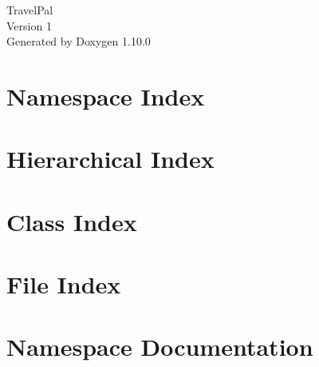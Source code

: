 \documentclass[twoside]{book}
\newcommand{\+}{\discretionary{\mbox{\scriptsize$\hookleftarrow$}}{}{}}
\newcommand{\clearemptydoublepage}{%
    \newpage{\pagestyle{empty}\cleardoublepage}%
  }
\begin{document}
  \raggedbottom
    \hypersetup{pageanchor=false,
                bookmarksnumbered=true,
                pdfencoding=unicode
               }
  \begin{titlepage}
  \vspace*{7cm}
  \begin{center}%
  {\Large Travel\+Pal}\\
  [1ex]\large Version 1 \\
  \vspace*{1cm}
  {\large Generated by Doxygen 1.10.0}\\
  \end{center}
  \end{titlepage}
  \clearemptydoublepage
  \tableofcontents
  \clearemptydoublepage
  \hypersetup{pageanchor=true}

\chapter{Namespace Index}

\chapter{Hierarchical Index}

\chapter{Class Index}

\chapter{File Index}

\chapter{Namespace Documentation}









\end{document}
